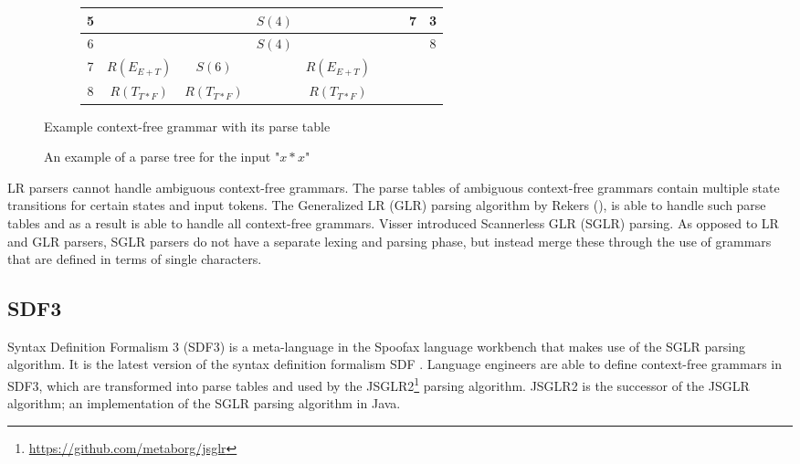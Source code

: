 \begin{figure}[h]
\begin{subfigure}[b]{0.75\textwidth}
\begin{tabular}{ c || c | c | c | c || c | c | c | c }
          \hline
          5 & & & $S(4)$ & & & & 7 & 3 \\
          \hline
          6 & & & $S(4)$ & & & & & 8 \\
          \hline
          7 & $R(E_{E+T})$ & $S(6)$ & & $R(E_{E+T})$ & & & & \\
          \hline
          8 & $R(T_{T*F})$ & $R(T_{T*F})$ & & $R(T_{T*F})$ & & & & \\
        \end{tabular}
        \caption{\label{fig:example-cfg-with-parse-table-tbl}}
      \end{subfigure}
      \caption{\label{fig:example-cfg-with-parse-table}Example context-free grammar with its parse table}
    \end{figure}

    \begin{figure}
      \centering
      \caption{\label{fig:example-parse-tree}An example of a parse tree for the input "$x * x$"}
    \end{figure}

    LR parsers cannot handle ambiguous context-free grammars. The parse tables of ambiguous context-free grammars contain multiple state transitions for certain states and input tokens. The Generalized LR (GLR) parsing algorithm by Rekers (\citeyear{Rekers1992}), is able to handle such parse tables and as a result is able to handle all context-free grammars. Visser \citeyear{Visser97SGLR} introduced Scannerless GLR (SGLR) parsing. As opposed to LR and GLR parsers, SGLR parsers do not have a separate lexing and parsing phase, but instead merge these through the use of grammars that are defined in terms of single characters.

    \subsection{\label{subsec:sdf3}SDF3}

      Syntax Definition Formalism 3 (SDF3) \autocite{VollebregtKV12,AmorimV20} is a meta-language in the Spoofax language workbench that makes use of the SGLR parsing algorithm. It is the latest version of the syntax definition formalism SDF \autocite{HeeringHKR89,Visser97}. Language engineers are able to define context-free grammars in SDF3, which are transformed into parse tables and used by the JSGLR2\footnote{\url{https://github.com/metaborg/jsglr}} parsing algorithm. JSGLR2 \autocite{Denkers2018} is the successor of the JSGLR algorithm; an implementation of the SGLR parsing algorithm in Java.

